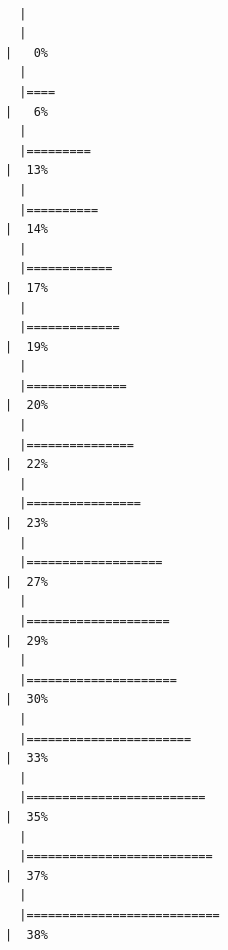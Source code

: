 \documentclass[
  letterpaper,
  DIV=11,
  numbers=noendperiod]{scrartcl}
\begin{document}
\begin{verbatim}

  |                                                                            
  |                                                                      |   0%
  |                                                                            
  |====                                                                  |   6%
  |                                                                            
  |=========                                                             |  13%
  |                                                                            
  |==========                                                            |  14%
  |                                                                            
  |============                                                          |  17%
  |                                                                            
  |=============                                                         |  19%
  |                                                                            
  |==============                                                        |  20%
  |                                                                            
  |===============                                                       |  22%
  |                                                                            
  |================                                                      |  23%
  |                                                                            
  |===================                                                   |  27%
  |                                                                            
  |====================                                                  |  29%
  |                                                                            
  |=====================                                                 |  30%
  |                                                                            
  |=======================                                               |  33%
  |                                                                            
  |=========================                                             |  35%
  |                                                                            
  |==========================                                            |  37%
  |                                                                            
  |===========================                                           |  38%

\end{verbatim}
\end{document}
